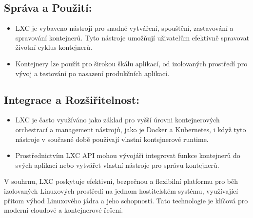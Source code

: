 \subsection{Správa a Použití:}
\begin{itemize}[label=]
    \item LXC je vybaveno nástroji pro snadné vytváření, spouštění, zastavování a spravování kontejnerů. Tyto nástroje umožňují uživatelům efektivně spravovat životní cyklus kontejnerů.
    \item Kontejnery lze použít pro širokou škálu aplikací, od izolovaných prostředí pro vývoj a testování po nasazení produkčních aplikací.
\end{itemize}

\subsection{Integrace a Rozšiřitelnost:}
\begin{itemize}[label=]
    \item LXC je často využíváno jako základ pro vyšší úrovni kontejnerových orchestrací a management nástrojů, jako je Docker a Kubernetes, i když tyto nástroje v současné době používají vlastní kontejnerové runtime.
    \item Prostřednictvím LXC API mohou vývojáři integrovat funkce kontejnerů do svých aplikací nebo vytvářet vlastní nástroje pro správu kontejnerů.
\end{itemize}

\noindent
V souhrnu, LXC poskytuje efektivní, bezpečnou a flexibilní platformu pro běh izolovaných Linuxových prostředí na jednom hostitelském systému, využívající přitom výhod Linuxového jádra a jeho schopností. Tato technologie je klíčová pro moderní cloudové a kontejnerové řešení.